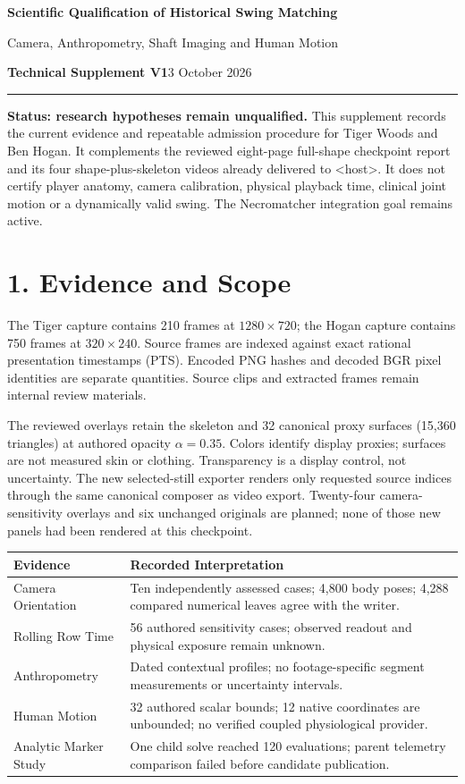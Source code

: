 \documentclass[11pt,a4paper]{article}
\begin{document}
{\LARGE\bfseries\color{ink} Scientific Qualification of Historical Swing Matching}\par
{\large Camera, Anthropometry, Shaft Imaging and Human Motion}\par
\textbf{Technical Supplement V1}\hfill 3 October 2026\par
\rule{\linewidth}{0.7pt}
\textbf{Status: research hypotheses remain unqualified.} This supplement records the current evidence and repeatable admission procedure for Tiger Woods and Ben Hogan. It complements the reviewed eight-page full-shape checkpoint report and its four shape-plus-skeleton videos already delivered to <host>. It does not certify player anatomy, camera calibration, physical playback time, clinical joint motion or a dynamically valid swing. The Necromatcher integration goal remains active.

\section*{1. Evidence and Scope}
The Tiger capture contains 210 frames at $1280\times720$; the Hogan capture contains 750 frames at $320\times240$. Source frames are indexed against exact rational presentation timestamps (PTS). Encoded PNG hashes and decoded BGR pixel identities are separate quantities. Source clips and extracted frames remain internal review materials.

The reviewed overlays retain the skeleton and 32 canonical proxy surfaces (15,360 triangles) at authored opacity $\alpha=0.35$. Colors identify display proxies; surfaces are not measured skin or clothing. Transparency is a display control, not uncertainty. The new selected-still exporter renders only requested source indices through the same canonical composer as video export. Twenty-four camera-sensitivity overlays and six unchanged originals are planned; none of those new panels had been rendered at this checkpoint.

\begin{center}\small
\begin{tabular}{p{48mm}p{91mm}}
\toprule
\textbf{Evidence} & \textbf{Recorded Interpretation}\\\midrule
Camera Orientation & Ten independently assessed cases; 4,800 body poses; 4,288 compared numerical leaves agree with the writer.\\
Rolling Row Time & 56 authored sensitivity cases; observed readout and physical exposure remain unknown.\\
Anthropometry & Dated contextual profiles; no footage-specific segment measurements or uncertainty intervals.\\
Human Motion & 32 authored scalar bounds; 12 native coordinates are unbounded; no verified coupled physiological provider.\\
Analytic Marker Study & One child solve reached 120 evaluations; parent telemetry comparison failed before candidate publication.\\\bottomrule
\end{tabular}\end{center}
\end{document}
